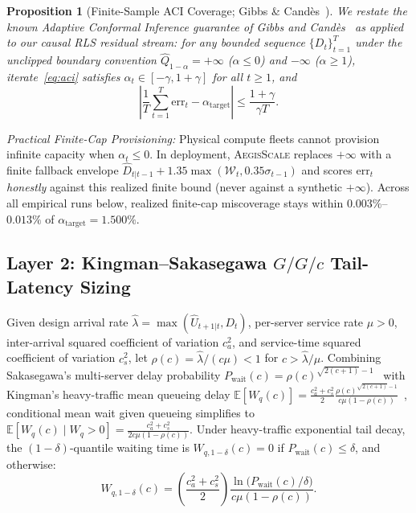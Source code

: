 \documentclass[journal]{IEEEtran}
\newtheorem{proposition}{Proposition}
\begin{document}
\begin{proposition}[Finite-Sample ACI Coverage; Gibbs \& Cand\`es~\cite{gibbs2021adaptive}]\label{prop:aci}
We restate the known Adaptive Conformal Inference guarantee of Gibbs and Cand\`es~\cite{gibbs2021adaptive} as applied to our causal RLS residual stream: for any bounded sequence $\{D_t\}_{t=1}^T$ under the unclipped boundary convention $\hat{Q}_{1-\alpha} = +\infty$ ($\alpha \le 0$) and $-\infty$ ($\alpha \ge 1$), iterate~\eqref{eq:aci} satisfies $\alpha_t \in [-\gamma, 1 + \gamma]$ for all $t \ge 1$, and
\begin{equation}
    \left| \frac{1}{T}\sum_{t=1}^T \mathrm{err}_t - \alpha_{\mathrm{target}} \right| \le \frac{1 + \gamma}{\gamma T}.
\end{equation}
\end{proposition}

\emph{Practical Finite-Cap Provisioning:} Physical compute fleets cannot provision infinite capacity when $\alpha_t \le 0$. In deployment, \textsc{AegisScale} replaces $+\infty$ with a finite fallback envelope $\hat{D}_{t|t-1} + 1.35\max(\mathcal{W}_t, 0.35\sigma_{t-1})$ and scores $\mathrm{err}_t$ \emph{honestly} against this realized finite bound (never against a synthetic $+\infty$). Across all empirical runs below, realized finite-cap miscoverage stays within $0.003\%$--$0.013\%$ of $\alpha_{\mathrm{target}} = 1.500\%$.

\subsection{Layer 2: Kingman--Sakasegawa $G/G/c$ Tail-Latency Sizing}

Given design arrival rate $\hat{\lambda} = \max(\hat{U}_{t+1|t}, D_t)$, per-server service rate $\mu > 0$, inter-arrival squared coefficient of variation $c_a^2$, and service-time squared coefficient of variation $c_s^2$, let $\rho(c) = \hat{\lambda}/(c\mu) < 1$ for $c > \hat{\lambda}/\mu$. Combining Sakasegawa's multi-server delay probability $P_{\mathrm{wait}}(c) = \rho(c)^{\sqrt{2(c+1)}-1}$~\cite{sakasegawa1977approximation} with Kingman's heavy-traffic mean queueing delay $\mathbb{E}[W_q(c)] = \frac{c_a^2 + c_s^2}{2}\frac{\rho(c)^{\sqrt{2(c+1)}-1}}{c\mu(1-\rho(c))}$~\cite{kingman1961single,whitt1993approximations}, conditional mean wait given queueing simplifies to $\mathbb{E}[W_q(c) \mid W_q > 0] = \frac{c_a^2 + c_s^2}{2c\mu(1-\rho(c))}$. Under heavy-traffic exponential tail decay, the $(1-\delta)$-quantile waiting time is $W_{q,1-\delta}(c) = 0$ if $P_{\mathrm{wait}}(c) \le \delta$, and otherwise:
\begin{equation}\label{eq:ggc_quantile}
    W_{q, 1-\delta}(c) = \left(\frac{c_a^2 + c_s^2}{2}\right)\frac{\ln\!\big(P_{\mathrm{wait}}(c)/\delta\big)}{c\mu(1-\rho(c))}.
\end{equation}
\end{document}

